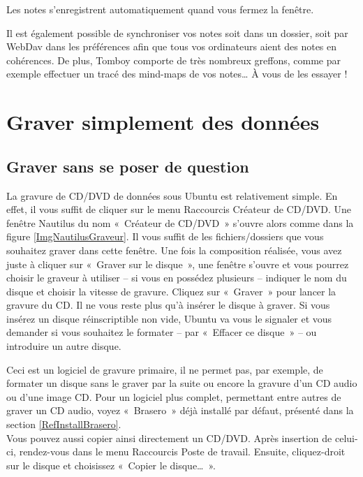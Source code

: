 Les notes s'enregistrent automatiquement quand vous fermez la fenêtre.\par
\begin{nota}
Il est également possible de synchroniser vos notes soit dans un dossier, soit par WebDav dans les préférences afin que tous vos ordinateurs aient des notes en cohérences. De plus, Tomboy comporte de très nombreux greffons, comme par exemple effectuer un tracé des mind-maps de vos notes\ldots{} À vous de les essayer !
\end{nota}
\section{Graver simplement des données}
\subsection{Graver sans se poser de question}
\label{RefGravureNautilus}
La gravure de CD/DVD de données sous Ubuntu est relativement simple. En effet, il vous suffit de cliquer sur le menu Raccourcis \FlecheDroite Créateur de CD/DVD. Une fenêtre Nautilus du nom «~Créateur de CD/DVD~» s'ouvre alors comme dans la figure \ref{ImgNautilusGraveur}. Il vous suffit de  les fichiers/dossiers que vous souhaitez graver dans cette fenêtre. Une fois la composition réalisée, vous avez juste à cliquer sur «~Graver sur le disque~», une fenêtre s'ouvre et vous pourrez choisir le graveur à utiliser -- si vous en possédez plusieurs -- indiquer le nom du disque et choisir la vitesse de gravure. Cliquez sur «~Graver~» pour lancer la gravure du CD. Il ne vous reste plus qu'à insérer le disque à graver. Si vous insérez un disque réinscriptible non vide, Ubuntu va vous le signaler et vous demander si vous souhaitez le formater -- par «~Effacer ce disque~» -- ou introduire un autre disque.\par
{}
\begin{nota}
Ceci est un logiciel de gravure primaire, il ne permet pas, par exemple, de formater un disque sans le graver par la suite ou encore la gravure d'un CD audio ou d'une image CD. Pour un logiciel plus complet, permettant entre autres de graver un CD audio, voyez «~Brasero~» déjà installé par défaut, présenté dans la section \ref{RefInstallBrasero}.\\
Vous pouvez aussi copier ainsi directement un CD/DVD. Après insertion de celui-ci, rendez-vous dans le menu Raccourcis \FlecheDroite Poste de travail. Ensuite, cliquez-droit sur le disque et choisissez «~Copier le disque\ldots{}~».
\end{nota}
